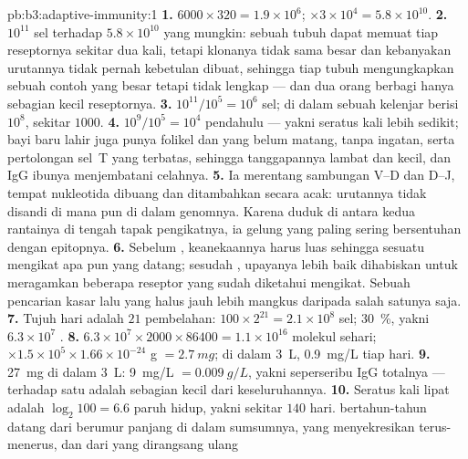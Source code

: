 \begin{solution}{pb:b3:adaptive-immunity:1}
\textbf{1.} $6000\times 320 = 1.9\times 10^{6}$; $\times 3\times 10^{4}
= 5.8\times 10^{10}$.
\textbf{2.} $10^{11}$ sel terhadap $5.8\times 10^{10}$ yang mungkin: sebuah tubuh
dapat memuat tiap reseptornya sekitar dua kali, tetapi klonanya tidak sama besar dan
kebanyakan urutannya tidak pernah kebetulan dibuat, sehingga tiap tubuh mengungkapkan
sebuah contoh yang besar tetapi tidak lengkap --- dan dua orang berbagi hanya sebagian
kecil reseptornya.
\textbf{3.} $10^{11}/10^{5} = 10^{6}$ sel; di dalam sebuah kelenjar berisi $10^{8}$,
sekitar $1000$.
\textbf{4.} $10^{9}/10^{5} = 10^{4}$ pendahulu --- yakni seratus kali lebih sedikit;
bayi baru lahir juga punya folikel dan  yang belum matang, tanpa
ingatan, serta pertolongan sel~T yang terbatas, sehingga tanggapannya lambat dan kecil, dan
IgG ibunya menjembatani celahnya.
\textbf{5.} Ia merentang sambungan V--D dan D--J, tempat nukleotida
dibuang dan ditambahkan secara acak: urutannya tidak disandi di mana pun di dalam
genomnya. Karena duduk di antara kedua rantainya di tengah tapak
pengikatnya, ia gelung yang paling sering bersentuhan dengan epitopnya.
\textbf{6.} Sebelum , keanekaannya harus luas sehingga sesuatu
mengikat apa pun yang datang; sesudah , upayanya lebih baik dihabiskan untuk meragamkan
beberapa reseptor yang sudah diketahui mengikat. Sebuah pencarian kasar lalu yang halus
jauh lebih mangkus daripada salah satunya saja.
\textbf{7.} Tujuh hari adalah $21$ pembelahan: $100\times 2^{21} = 2.1\times
10^{8}$ sel; \qty{30}{\%}, yakni $6.3\times 10^{7}$ .
\textbf{8.} $6.3\times 10^{7}\times 2000\times \num{86400} = 1.1\times
10^{16}$ molekul sehari; $\times 1.5\times 10^{5}\times 1.66\times
10^{-24}$ g $= \qty{2.7}{mg}$; di dalam \qty{3}{L}, \qty{0.9}{mg/L} tiap hari.
\textbf{9.} \qty{27}{mg} di dalam \qty{3}{L}: \qty{9}{mg/L} $= \qty{0.009}{g/L}$,
yakni seperseribu IgG totalnya ---  terhadap satu  adalah
sebagian kecil dari keseluruhannya.
\textbf{10.} Seratus kali lipat adalah $\log_{2}100 = 6.6$ paruh hidup, yakni sekitar
$140$ hari.  bertahun-tahun datang dari  berumur panjang di dalam
sumsumnya, yang menyekresikan terus-menerus, dan dari  yang dirangsang ulang

\end{solution}
